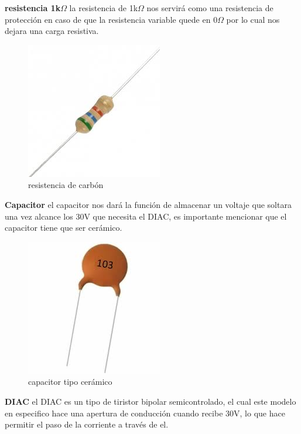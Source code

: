 \documentclass[11pt,a4paper]{article}
\begin{document}
\textbf{resistencia 1k$\Omega$} la resistencia de 1k$\Omega$ nos servirá como una resistencia de protección en caso de que la resistencia variable quede en 0$\Omega$ por lo cual nos dejara una carga resistiva.\\

\begin{figure}[h]
\begin{center}
\includegraphics[scale=0.4]{4.jpeg}
\caption{resistencia de carbón}
\end{center}
\end{figure}


\textbf{Capacitor} el capacitor nos dará la función de almacenar un voltaje que soltara una vez  alcance los 30V que necesita el DIAC, es importante mencionar que el capacitor tiene que ser cerámico.\\

\begin{figure}[h]
\begin{center}
\includegraphics[scale=0.4]{5.jpeg}
\caption{capacitor tipo cerámico}
\end{center}
\end{figure}


\newpage

\textbf{DIAC} el DIAC es un tipo de tiristor bipolar semicontrolado, el cual este modelo en especifico hace una apertura de conducción cuando recibe 30V, lo que hace permitir el paso de la corriente a través de el.\\
\end{document}
